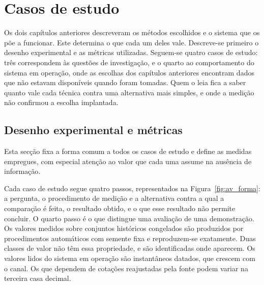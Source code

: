 \chapter{Casos de estudo}
\label{cap:avaliacao}

Os dois capítulos anteriores descreveram os métodos escolhidos e o sistema que os põe a funcionar.
Este determina o que cada um deles vale. Descreve-se primeiro o desenho experimental e as métricas
utilizadas. Seguem-se quatro casos de estudo: três correspondem às questões de investigação, e o
quarto ao comportamento do sistema em operação, onde as escolhas dos capítulos anteriores encontram
dados que não estavam disponíveis quando foram tomadas. Quem o leia fica a saber quanto vale cada técnica contra uma alternativa mais simples, e onde a medição não confirmou a escolha implantada.

\section{Desenho experimental e métricas}
\label{sec:av_desenho}

Esta secção fixa a forma comum a todos os casos de estudo e define as medidas empregues, com
especial atenção ao valor que cada uma assume na ausência de informação.

Cada caso de estudo segue quatro passos, representados na Figura~\ref{fig:av_forma}: a pergunta, o
procedimento de medição e a alternativa contra a qual a comparação é feita, o resultado obtido, e o
que esse resultado não permite concluir. O quarto passo é o que distingue uma avaliação de uma
demonstração. Os valores medidos sobre conjuntos históricos congelados são produzidos por procedimentos
automáticos com semente fixa e reproduzem-se exatamente. Duas classes de valor não têm essa propriedade, e são identificadas onde aparecem. Os valores
lidos do sistema em operação são instantâneos datados, que crescem com o canal. Os que dependem de
cotações reajustadas pela fonte podem variar na terceira casa decimal.

